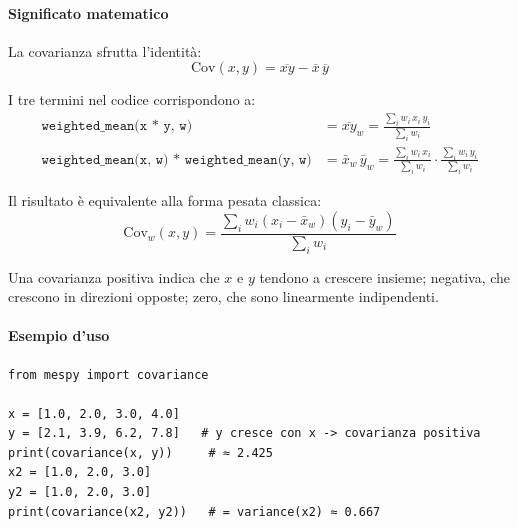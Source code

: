 \paragraph{Significato matematico}
La covarianza sfrutta l'identità:
$$\text{Cov}(x,y) = \overline{xy} - \overline{x}\,\overline{y}$$

I tre termini nel codice corrispondono a:
\begin{align*}
  \texttt{weighted\_mean(x * y, w)} &= \overline{xy}_w = \frac{\sum_i w_i \, x_i \, y_i}{\sum_i w_i} \\[4pt]
  \texttt{weighted\_mean(x, w) * weighted\_mean(y, w)} &= \bar{x}_w \, \bar{y}_w =
    \frac{\sum_i w_i \, x_i}{\sum_i w_i} \cdot \frac{\sum_i w_i \, y_i}{\sum_i w_i}
\end{align*}

Il risultato è equivalente alla forma pesata classica:
$$\text{Cov}_w(x,y) = \frac{\sum_i w_i (x_i - \bar{x}_w)(y_i - \bar{y}_w)}{\sum_i w_i}$$

Una covarianza positiva indica che $x$ e $y$ tendono a crescere insieme;
negativa, che crescono in direzioni opposte; zero, che sono linearmente indipendenti.

\paragraph{Esempio d'uso}
\begin{verbatim}
from mespy import covariance

x = [1.0, 2.0, 3.0, 4.0]
y = [2.1, 3.9, 6.2, 7.8]   # y cresce con x -> covarianza positiva
print(covariance(x, y))     # ≈ 2.425
x2 = [1.0, 2.0, 3.0]
y2 = [1.0, 2.0, 3.0]
print(covariance(x2, y2))   # = variance(x2) ≈ 0.667
\end{verbatim}


